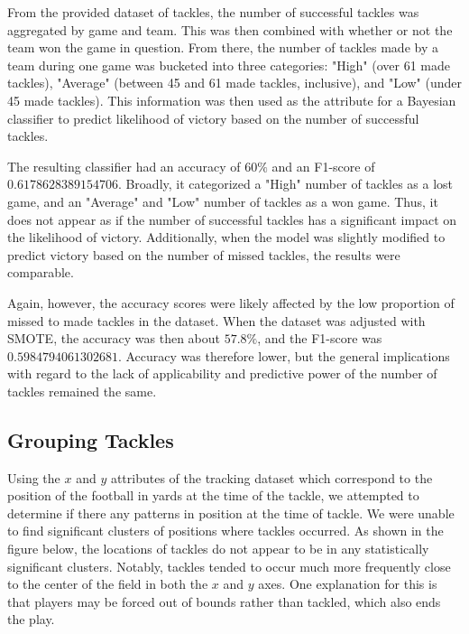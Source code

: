 \documentclass[bibtex, sigconf, hyperref={colorlinks=true,linkcolor=blue,urlcolor=blue}]{acmart}
\begin{document}
From the provided dataset of tackles, the number of successful tackles was aggregated by game and team.
This was then combined with whether or not the team won the game in question. From there, the number of
tackles made by a team during one game was bucketed into three categories: "High" (over 61 made tackles),
"Average" (between 45 and 61 made tackles, inclusive), and "Low" (under 45 made tackles). This information
was then used as the attribute for a Bayesian classifier to predict likelihood of victory based on the
number of successful tackles.

The resulting classifier had an accuracy of $60\%$ and an F1-score of $0.6178628389154706$. Broadly, it
categorized a "High" number of tackles as a lost game, and an "Average" and "Low" number of tackles as a
won game. Thus, it does not appear as if the number of successful tackles has a significant impact on the likelihood
of victory. Additionally, when the model was slightly modified to predict victory based on the number of
missed tackles, the results were comparable.

Again, however, the accuracy scores were likely affected by the low proportion of missed to made tackles
in the dataset. When the dataset was adjusted with SMOTE, the accuracy was then about $57.8\%$, and
the F1-score was $0.5984794061302681$. Accuracy was therefore lower, but the general implications with
regard to the lack of applicability and predictive power of the number of tackles remained the same.

\subsection{Grouping Tackles}

Using the $x$ and $y$ attributes of the tracking dataset which correspond to the
position of the football in yards at the time of the tackle, we attempted to
determine if there any patterns in position at the time of tackle.
We were unable to find significant clusters of positions where tackles
occurred. As shown in the figure below, the locations of tackles do not appear
to be in any statistically significant clusters. Notably, tackles tended to
occur much more frequently close to the center of the field in both the $x$ and
$y$ axes. One explanation for this is that players may be forced out of bounds
rather than tackled, which also ends the play.
\end{document}
